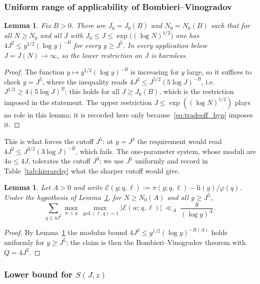 \documentclass[11pt, a4paper]{article}
\theoremstyle{plain}
\newtheorem{lemma}[theorem]{Lemma}
\theoremstyle{definition}
\begin{document}
\subsubsection{Uniform range of applicability of Bombieri--Vinogradov} \label{sec:5.2.1}

\begin{lemma} \label{lem:5.3}
Fix $B>0$. There are $J_0=J_0(B)$ and $N_0=N_0(B)$ such that for all $N\ge N_0$ and all $J$ with $J_0\le J\le\exp\big((\log N)^{1/2}\big)$ one has $4J^{2}\le y^{1/2}(\log y)^{-B}$ for every $y\ge J^{5}$. In every application below $J=J(N)\to\infty$, so the lower restriction on $J$ is harmless.
\end{lemma}
\begin{proof}
The function $y\mapsto y^{1/2}(\log y)^{-B}$ is increasing for $y$ large, so it suffices to check $y=J^{5}$, where the inequality reads $4J^{2}\le J^{5/2}(5\log J)^{-B}$, i.e. $J^{1/2}\ge 4(5\log J)^{B}$; this holds for all $J\ge J_0(B)$, which is the restriction imposed in the statement. The upper restriction $J\le\exp((\log N)^{1/2})$ plays no role in this lemma; it is recorded here only because~\eqref{eq:tradeoff_hyp} imposes it.
\end{proof}

This is what forces the cutoff $J^{5}$: at $y=J^{3}$ the requirement would read $4J^{2}\le J^{3/2}(3\log J)^{-B}$, which fails. The one-parameter system, whose moduli are $4u\le4J$, tolerates the cutoff $J^{3}$; we use $J^{5}$ uniformly and record in Table~\ref{tab:hierarchy} what the sharper cutoff would give.

\begin{lemma} \label{lem:5.4}
Let $A>0$ and write $\mathcal{E}(y; q, \ell) := \pi(y; q, \ell) - \mathrm{li}(y)/\varphi(q)$. Under the hypothesis of Lemma~\ref{lem:5.3}, for $N\ge N_0(A)$ and all $y\ge J^{5}$,
\begin{equation} \label{eq:5.4.1}
\sum_{q \le 4J^{2}} \max_{w \le y} \max_{\gcd(\ell,q)=1}\big|\mathcal{E}(w; q, \ell)\big| \ \ll_A\ \frac{y}{(\log y)^{A}} .
\end{equation}
\end{lemma}
\begin{proof}
By Lemma~\ref{lem:5.3} the modulus bound $4J^{2}\le y^{1/2}(\log y)^{-B(A)}$ holds uniformly for $y\ge J^{5}$; the claim is then the Bombieri--Vinogradov theorem with $Q=4J^{2}$.
\end{proof}

\subsubsection{Lower bound for $S(J,z)$} \label{sec:5.2.2}
\end{document}
